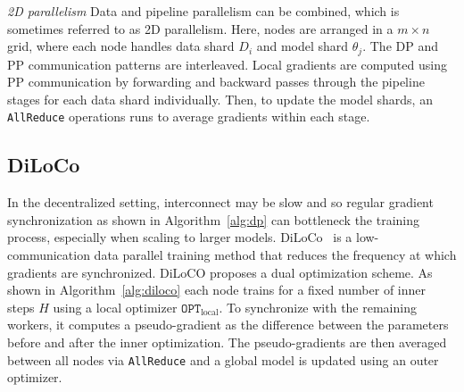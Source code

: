 \documentclass[conference, 10pt]{IEEEtran}
\begin{document}

\textit{2D parallelism} Data and pipeline parallelism can be combined, which is
sometimes referred to as 2D parallelism. Here, nodes are arranged in a $m\times
n$ grid, where each node handles data shard $D_i$ and model shard $\theta_j$.
The DP and PP communication patterns are interleaved. Local gradients are
computed using PP communication by forwarding and backward passes through the
pipeline stages for each data shard individually. Then, to update the model
shards, an \texttt{AllReduce} operations runs to average gradients within each
stage.

\subsection{DiLoCo}

In the decentralized setting, interconnect may be slow and so regular gradient
synchronization as shown in Algorithm~\ref{alg:dp} can bottleneck the training
process, especially when scaling to larger models. DiLoCo~\cite{douillard2023}
is a low-communication data parallel training method that reduces the frequency
at which gradients are synchronized. DiLoCO proposes a dual optimization scheme.
As shown in Algorithm~\ref{alg:diloco} each node trains for a fixed number of
inner steps $H$ using a local optimizer $\mathtt{OPT}_{\text{local}}$. To
synchronize with the remaining workers, it computes a pseudo-gradient as the
difference between the parameters before and after the inner optimization. The
pseudo-gradients are then averaged between all nodes via \texttt{AllReduce} and
a global model is updated using an outer optimizer. 
\end{document}
